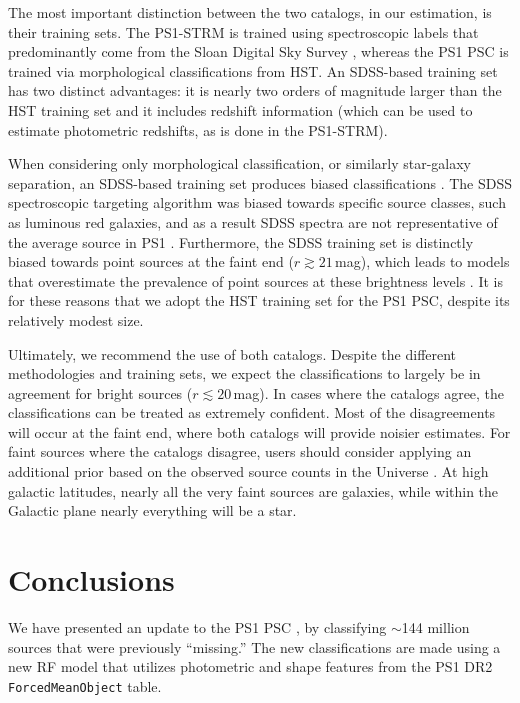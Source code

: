 \documentclass[twocolumn]{aastex63}
\begin{document}
The most important distinction between the two catalogs, in our estimation, is
their training sets. The PS1-STRM is trained using spectroscopic labels that
predominantly come from the Sloan Digital Sky Survey
\citep[SDSS;][]{Abolfathi18}, whereas the PS1 PSC is trained via morphological
classifications from HST. An SDSS-based training set has two distinct
advantages: it is nearly two orders of magnitude larger than the HST training
set and it includes redshift information (which can be used to estimate
photometric redshifts, as is done in the PS1-STRM).

When considering only morphological classification, or similarly star-galaxy
separation, an SDSS-based training set produces biased classifications
\citep{Miller17,Tachibana18}. The SDSS spectroscopic targeting algorithm was
biased towards specific source classes, such as luminous red galaxies, and as
a result SDSS spectra are not representative of the average source in PS1
\citep[see Figure~1 in][]{Tachibana18}. Furthermore, the SDSS training set is
distinctly biased towards point sources at the faint end ($r \gtrsim
21$\,mag), which leads to models that overestimate the prevalence of point
sources at these brightness levels \citep[see e.g., Figure~7
in][]{Tachibana18}. It is for these reasons that we adopt the HST training set
for the PS1 PSC, despite its relatively modest size.

Ultimately, we recommend the use of both catalogs. Despite the different
methodologies and training sets, we expect the classifications to largely be in
agreement for bright sources ($r \lesssim 20$\,mag). In cases where the
catalogs agree, the classifications can be treated as extremely confident.
Most of the disagreements will occur at the faint end, where both catalogs
will provide noisier estimates. For faint sources where the catalogs disagree,
users should consider applying an additional prior based on the observed
source counts in the Universe \citep[e.g.,][]{Henrion11}. At high galactic
latitudes, nearly all the very faint sources are galaxies, while within the
Galactic plane nearly everything will be a star.

\section{Conclusions}

We have presented an update to the PS1 PSC \citep{Tachibana18}, by classifying
$\sim$144 million sources that were previously ``missing.'' The new
classifications are made using a new RF model that utilizes photometric and
shape features from the PS1 DR2 \texttt{ForcedMeanObject} table.
\end{document}

